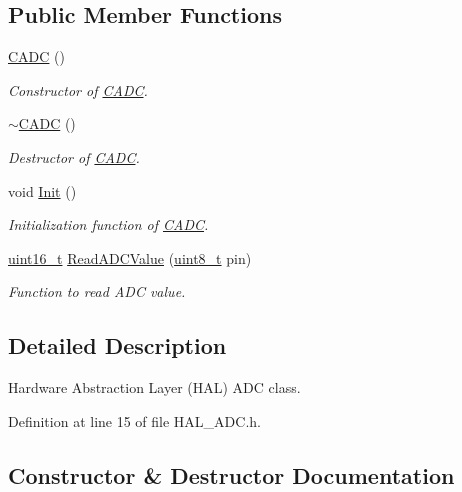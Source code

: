 \subsection*{Public Member Functions}
\begin{DoxyCompactItemize}
\item 
\mbox{\hyperlink{class_c_a_d_c_aa312b17b94e31c72be8463a4a14838ec}{C\+A\+DC}} ()
\begin{DoxyCompactList}\small\item\em Constructor of \mbox{\hyperlink{class_c_a_d_c}{C\+A\+DC}}. \end{DoxyCompactList}\item 
\mbox{\hyperlink{class_c_a_d_c_ab8a5414ebb4c3707ac1575d63635efd8}{$\sim$\+C\+A\+DC}} ()
\begin{DoxyCompactList}\small\item\em Destructor of \mbox{\hyperlink{class_c_a_d_c}{C\+A\+DC}}. \end{DoxyCompactList}\item 
void \mbox{\hyperlink{class_c_a_d_c_a09118c55821cd6f0c9b2e2d2edd40d33}{Init}} ()
\begin{DoxyCompactList}\small\item\em Initialization function of \mbox{\hyperlink{class_c_a_d_c}{C\+A\+DC}}. \end{DoxyCompactList}\item 
\mbox{\hyperlink{_a_d_a_s___types_8h_a1f1825b69244eb3ad2c7165ddc99c956}{uint16\+\_\+t}} \mbox{\hyperlink{class_c_a_d_c_ac2f897fc64f605751ac3ffe7d2704ba6}{Read\+A\+D\+C\+Value}} (\mbox{\hyperlink{_a_d_a_s___types_8h_aba7bc1797add20fe3efdf37ced1182c5}{uint8\+\_\+t}} pin)
\begin{DoxyCompactList}\small\item\em Function to read A\+DC value. \end{DoxyCompactList}\end{DoxyCompactItemize}


\subsection{Detailed Description}
Hardware Abstraction Layer (H\+AL) A\+DC class. 

Definition at line 15 of file H\+A\+L\+\_\+\+A\+D\+C.\+h.



\subsection{Constructor \& Destructor Documentation}
\mbox{\label{class_c_a_d_c_aa312b17b94e31c72be8463a4a14838ec}} 
